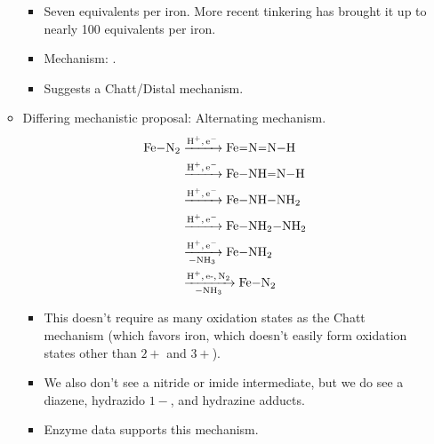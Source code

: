 \documentclass[../notes.tex]{subfiles}
\begin{document}
\begin{itemize}
\begin{itemize}
        \begin{itemize}
            \item Seven equivalents per iron. More recent tinkering has brought it up to nearly 100 equivalents per iron.
            \item Mechanism: .
            \item Suggests a Chatt/Distal mechanism.
        \end{itemize}
        \item Differing mechanistic proposal: Alternating mechanism.
        \begin{align*}
            \ce{Fe-N2} &\ce{->[H+,e-]} \ce{Fe=N=N-H}\\
            &\ce{->[H+,e-]} \ce{Fe-NH=N-H}\\
            &\ce{->[H+,e-]} \ce{Fe-NH-NH2}\\
            &\ce{->[H+,e-]} \ce{Fe-NH2-NH2}\\
            &\ce{->[H+,e-][-NH3]} \ce{Fe-NH2}\\
            &\ce{->[H+,e-,N2][-NH3]} \ce{Fe-N2}
        \end{align*}
        \begin{itemize}
            \item This doesn't require as many oxidation states as the Chatt mechanism (which favors iron, which doesn't easily form oxidation states other than $2+$ and $3+$).
            \item We also don't see a nitride or imide intermediate, but we do see a diazene, hydrazido $1-$, and hydrazine adducts.
            \item Enzyme data supports this mechanism.
        \end{itemize}
    \end{itemize}
\end{itemize}
\end{document}
